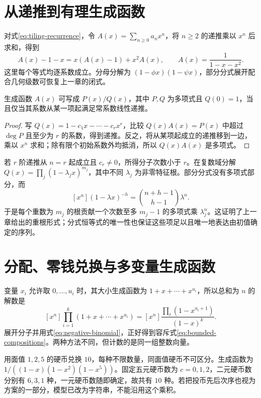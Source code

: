 \section{从递推到有理生成函数}

对式\eqref{eq:tiling-recurrence}，令 $A(x)=\sum_{n\ge0}a_nx^n$，将 $n\ge2$ 的递推乘以 $x^n$ 后求和，得到
\[
 A(x)-1-x=x(A(x)-1)+x^2A(x),\qquad
 A(x)=\frac{1}{1-x-x^2}.
\]
这里每个等式均逐系数成立。分母分解为 $(1-\phi x)(1-\psi x)$，部分分式展开配合几何级数可恢复上一章的闭式。

\begin{proposition}
生成函数 $A(x)$ 可写成 $P(x)/Q(x)$，其中 $P,Q$ 为多项式且 $Q(0)=1$，当且仅当其系数从某一项起满足常系数线性递推。
\end{proposition}
\begin{proof}
写 $Q(x)=1-c_1x-\cdots-c_rx^r$，比较 $Q(x)A(x)=P(x)$ 中超过 $\deg P$ 且至少为 $r$ 的系数，得到递推。反之，将从某项起成立的递推移到一边，乘以 $x^n$ 求和；除有限个初始系数外均抵消，所以 $Q(x)A(x)$ 是多项式。
\end{proof}

若 $r$ 阶递推从 $n=r$ 起成立且 $c_r\ne0$，所得分子次数小于 $r$。在复数域分解 $Q(x)=\prod_j(1-\lambda_jx)^{m_j}$，其中不同 $\lambda_j$ 为非零特征根。部分分式没有多项式部分，而
\[
 [x^n](1-\lambda x)^{-h}=\binom{n+h-1}{h-1}\lambda^n.
\]
于是每个重数为 $m_j$ 的根贡献一个次数至多 $m_j-1$ 的多项式乘 $\lambda_j^n$。这证明了上一章给出的重根形式；分式恒等式的唯一性也保证这些项足以且唯一地表达由初值确定的序列。

\section{分配、零钱兑换与多变量生成函数}

变量 $x_i$ 允许取 $0,\ldots,u_i$ 时，其大小生成函数为 $1+x+\cdots+x^{u_i}$，所以总和为 $n$ 的解数是
\[
 [x^n]\prod_{i=1}^k(1+x+\cdots+x^{u_i})
 =[x^n]\frac{\prod_i(1-x^{u_i+1})}{(1-x)^k}.
\]
展开分子并用式\eqref{eq:negative-binomial}，正好得到容斥式\eqref{eq:bounded-compositions}。两种方法不同，但计数的是同一组整数向量。

\begin{example}[零钱兑换]
用面值 $1,2,5$ 的硬币兑换 $10$，每种不限数量，同面值硬币不可区分。生成函数为 $1/((1-x)(1-x^2)(1-x^5))$。固定五元硬币数为 $c=0,1,2$，二元硬币数分别有 $6,3,1$ 种，一元硬币数随即确定，故共有 $10$ 种。若把投币先后次序也视为方案的一部分，模型已改为字符串，不能沿用这个乘积。
\end{example}

